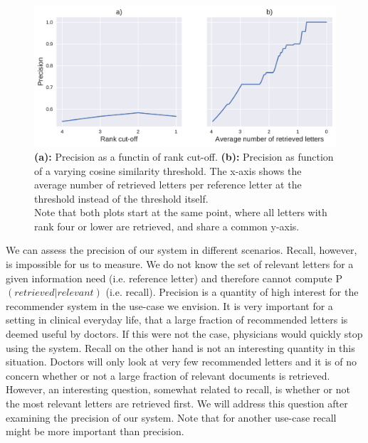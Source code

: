 \begin{figure}
	\includegraphics[width=\linewidth]{figures/precision_rank_sim}
	\caption{\textbf{(a):} Precision as a functin of rank cut-off. \textbf{(b):} Precision as function of a varying cosine similarity threshold. The x-axis shows the average number of retrieved letters per reference letter at the threshold instead of the threshold itself.\\
	Note that both plots start at the same point, where all letters with rank four or lower are retrieved, and share a common y-axis.}
	\label{fig:precision}
\end{figure}

We can assess the precision of our system in different scenarios. Recall, however, is impossible for us to measure. We do not know the set of relevant letters for a given information need (i.e. reference letter) and therefore cannot compute P$(retrieved|relevant)$ (i.e. recall). Precision is a quantity of high interest for the recommender system in the use-case we envision. It is very important for a setting in clinical everyday life, that a large fraction of recommended letters is deemed useful by doctors. If this were not the case, physicians would quickly stop using the system. Recall on the other hand is not an interesting quantity in this situation. Doctors will only look at very few recommended letters and it is of no concern whether or not a large fraction of relevant documents is retrieved. However, an interesting question, somewhat related to recall, is whether or not the most relevant letters are retrieved first. We will address this question after examining the precision of our system. Note that for another use-case recall might be more important than precision. 

